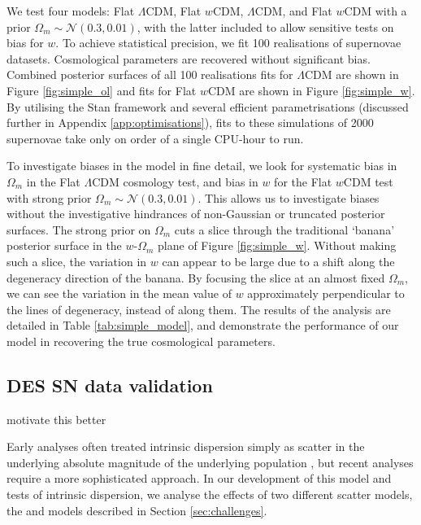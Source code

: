 \documentclass[a4paper,fleqn,usenatbib]{mnras}
\newcommand{\red}{\color{red}}
\newcommand{\gten}{\citetalias{Guy2010}}
\newcommand{\celeven}{\citetalias{Chotard2011}}
\begin{document}
We test four models: Flat $\Lambda$CDM, Flat $w$CDM, $\Lambda$CDM, and Flat $w$CDM with a prior $\Omega_m \sim \mathcal{N}(0.3, 0.01)$, with the latter included to allow sensitive tests on bias for $w$. To achieve statistical precision, we fit 100 realisations of supernovae datasets. Cosmological parameters are recovered without significant bias. Combined posterior surfaces of all 100 realisations fits for $\Lambda$CDM are shown in Figure \ref{fig:simple_ol} and fits for Flat $w$CDM are shown in Figure \ref{fig:simple_w}. By utilising the Stan framework and several efficient parametrisations (discussed further in Appendix \ref{app:optimisations}), fits to these simulations of 2000 supernovae take only on order of a single CPU-hour to run.

To investigate biases in the model in fine detail, we look for systematic bias in $\Omega_m$ in the Flat $\Lambda$CDM cosmology test, and bias in $w$ for the Flat $w$CDM test with strong prior $\Omega_m \sim \mathcal{N}(0.3, 0.01)$. This allows us to investigate biases without the investigative hindrances of non-Gaussian or truncated posterior surfaces. The strong prior on $\Omega_m$ cuts a slice through the traditional `banana' posterior surface in the $w$-$\Omega_m$ plane of Figure \ref{fig:simple_w}. Without making such a slice, the variation in $w$ can appear to be large due to a shift along the degeneracy direction of the banana. By focusing the slice at an almost fixed $\Omega_m$, we can see the variation in the mean value of $w$ approximately perpendicular to the lines of degeneracy, instead of along them. The results of the analysis are detailed in Table \ref{tab:simple_model}, and demonstrate the performance of our model in recovering the true cosmological parameters.




















\subsection{DES SN data validation}
\label{sec:simdes}

{\red motivate this better}

Early analyses often treated intrinsic dispersion simply as scatter in the underlying absolute magnitude of the underlying population \citep{Conley2011, Betoule2014}, but recent analyses require a more sophisticated approach. In our development of this model and tests of intrinsic dispersion, we analyse the effects of two different scatter models, the {\gten} and {\celeven} models described in Section \ref{sec:challenges}.
\end{document}
